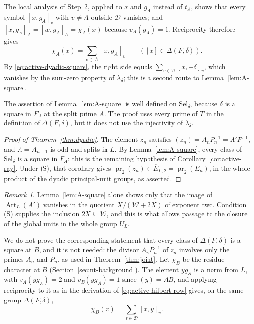 \documentclass[11pt]{article}
\theoremstyle{plain}
\theoremstyle{definition}
\theoremstyle{remark}
\newtheorem{remark}[theorem]{Remark}
\begin{document}
The local analysis of Step~2, applied to $x$ and $g_A$ instead of $t_A$,
shows that every symbol $[x,g_A]_v$ with $v\ne A$ outside $\mathcal D$
vanishes; and $[x,g_A]_A=[w,g_A]_A=\chi_A(x)$ because $v_A(g_A)=1$.  Reciprocity therefore gives
\begin{equation}\label{eq:active-hilbert-row}
 \chi_A(x)=\sum_{v\in\mathcal D}[x,g_A]_v
 \qquad([x]\in\Delta(F,\delta)).
\end{equation}
By \eqref{eq:active-dyadic-square}, the right side equals
$\sum_{v\in\mathcal D}[x,-\delta]_v$, which vanishes by the sum-zero
property of $\lambda_\delta$; this is a second route to
Lemma~\ref{lem:A-square}.

The assertion of Lemma~\ref{lem:A-square} is well defined on
$\mathrm{Sel}_\delta$, because $\delta$ is a square in $F_A$ at the split
prime $A$.  The proof uses every prime of $T$ in the definition of
$\Delta(F,\delta)$, but it does not use the injectivity of
$\lambda_\delta$.

\begin{proof}[Proof of Theorem~\ref{thm:dyadic}]
The element $z_n$ satisfies $(z_n)=A_nP_n^{-1}=A'P^{-1}$, and $A=A_{n-1}$
is odd and splits in $L$.  By Lemma~\ref{lem:A-square}, every class of
$\mathrm{Sel}_\delta$ is a square in $F_A$; this is the remaining
hypothesis of Corollary~\ref{cor:active-ray}.  Under (S), that corollary
gives $\operatorname{pr}_2(z_n)\in\overline E_{L,2}
=\overline{\operatorname{pr}_2(E_n)}$, in the whole product of the dyadic
principal-unit groups, as asserted.
\end{proof}

\begin{remark}\label{rem:dyadic-role-of-S}
Lemma~\ref{lem:A-square} alone shows only that the image of
$\operatorname{Art}_L(A')$ vanishes in the quotient $X/(\mathcal W+2X)$
of exponent two.  Condition (S) supplies the inclusion
$2X\subseteq\mathcal W$, and this is what allows passage to the closure
of the global units in the whole group $U_L$.

We do not prove the corresponding statement that every class of
$\Delta(F,\delta)$ is a square at $B$, and it is not needed: the divisor
$A_nP_n^{-1}$ of $z_n$ involves only the primes $A_n$ and $P_n$, as used
in Theorem~\ref{thm:joint}.  Let $\chi_B$ be the residue character at $B$
(Section~\ref{sec:nt-background}).  The element $yg_A$ is a norm from
$L$, with $v_A(yg_A)=2$ and $v_B(yg_A)=1$ since $(y)=AB$, and applying reciprocity to it
as in the derivation of \eqref{eq:active-hilbert-row} gives, on the same group
$\Delta(F,\delta)$,
\[
 \chi_B(x)=\sum_{v\in\mathcal D}[x,y]_v.
\]
\end{remark}
\end{document}
